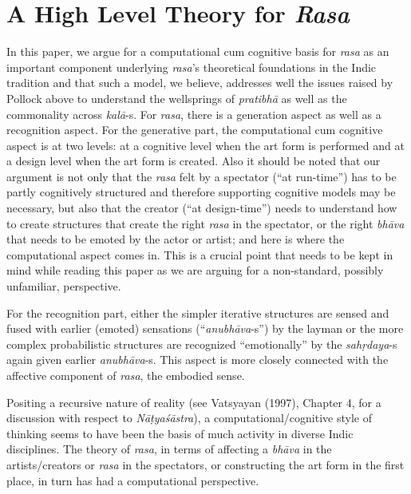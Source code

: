 \section{A High Level Theory for \textsl{Rasa}}\label{chap3-sec3}

In this paper, we argue for a computational cum cognitive basis for \textsl{rasa} as an important component underlying \textsl{rasa}’s theoretical foundations in the Indic tradition and that such a model, we believe, addresses well the issues raised by Pollock above to understand the wellsprings of \textsl{pratibhā} as well as the commonality across \textsl{kalā}-s. For \textsl{rasa}, there is a generation aspect as well as a recognition aspect. For the generative part, the computational cum cognitive aspect is at two levels: at a cognitive level when the art form is performed and at a design level when the art form is created. Also it should be noted that our argument is not only that the \textsl{rasa} felt by a spectator (“at run-time”) has to be partly cognitively structured and therefore supporting cognitive models may be necessary, but also that the creator (“at design-time”) needs to understand how to create structures that create the right \textsl{rasa} in the spectator, or the right \textsl{bhāva} that needs to be emoted by the actor or artist; and here is where the computational aspect comes in. This is a crucial point that needs to be kept in mind while reading this paper as we are arguing for a non-standard, possibly unfamiliar, perspective. 

For the recognition part, either the simpler iterative structures are sensed and fused with earlier (emoted) sensations \hbox{(“\textsl{anubhāva}-s”)} by the layman or the more complex probabilistic structures are recognized “emotionally” by the \textsl{sahṛdaya}-s again given earlier \textsl{anubhāva}-s. This aspect is more closely connected with the affective component of \textsl{rasa}, the embodied sense.


Positing a recursive nature of reality (see Vatsyayan (1997), Chapter 4, for a discussion with respect to \textsl{Nāṭyaśāstra}), a computational/cog\-ni\-tive style of thinking seems to have been the basis of much activity in diverse Indic disciplines. The theory of \textsl{rasa}, in terms of affecting a \textsl{bhāva} in the artists/creators or \textsl{rasa} in the spectators, or constructing the art form in the first place, in turn has had a computational perspective. 


